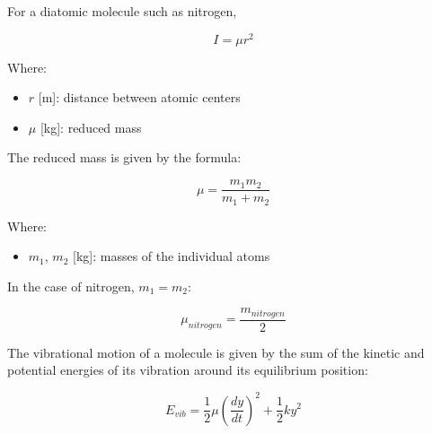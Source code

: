 \documentclass[../main]{subfiles}
\begin{document}
For a diatomic molecule such as nitrogen, 

\vspace{0mm}
\begin{equation}
    I = \mu r^{2}
\label{e:moment_of_inertia}
\end{equation}
\vspace{0mm}

\vspace{0mm}
\begin{minipage}{\linewidth}
Where:
\begin{itemize}
    \item[] $r$ [m]: distance between atomic centers
    \item[] $\mu$ [kg]: reduced mass
\end{itemize}
\end{minipage}
\vspace{0mm}

The reduced mass is given by the formula:

\vspace{0mm}
\begin{equation}
\mu = \frac{m_{1}m_{2}}{m_{1}+m_{2}}
\label{e:reduced_mass}
\end{equation}
\vspace{0mm}

\vspace{0mm}
\begin{minipage}{\linewidth}
Where:
\begin{itemize}
    \item[] $m_1$, $m_2$ [kg]: masses of the individual atoms
\end{itemize}
\end{minipage}
\vspace{0mm}

In the case of nitrogen, $m_1 = m_2$:

\vspace{0mm}
\begin{equation}
\mu_{nitrogen} = \frac{m_{nitrogen}}{2}
\label{e:reduced_mass_nitrogen}
\end{equation}
\vspace{0mm}

The vibrational motion of a molecule is given by the sum of the kinetic and potential energies of its vibration around its equilibrium position:

\vspace{0mm}
\begin{equation}
E_{vib} = \frac{1}{2}\mu\left(\frac{dy}{dt}\right)^{2}+\frac{1}{2}ky^{2}
\label{e:vibrational_energy}
\end{equation}
\vspace{0mm}
\end{document}
